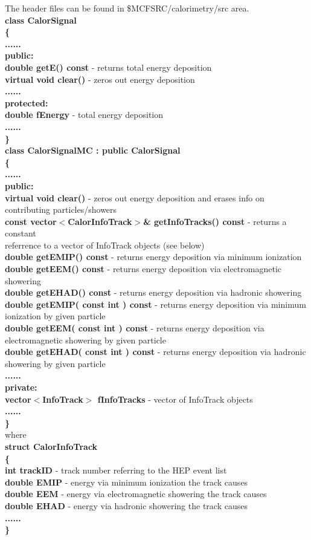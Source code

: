 The header files can be found in \$MCFSRC/calorimetry/src area. \\
{\bf class CalorSignal \\
\{ \\
...... \\
public: \\
double getE() const } - returns total energy deposition  \\
{\bf virtual void clear()} - zeros out energy deposition \\ 
{\bf ...... \\
protected: \\
double fEnergy } - total energy deposition \\
{\bf ...... \\
\} } \\
{\bf class CalorSignalMC : public CalorSignal \\
\{ \\
...... \\
public: \\
virtual void clear() } - zeros out energy deposition and erases info on contributing particles/showers \\
{\bf const vector$<$CalorInfoTrack$>$\& getInfoTracks() const} - returns a constant \\
referrence to a vector
of InfoTrack objects (see below) \\ 
{\bf double getEMIP() const} - returns energy deposition via minimum ionization \\
{\bf double getEEM()  const} - returns energy deposition via electromagnetic showering \\
{\bf double getEHAD() const} - returns energy deposition via hadronic showering \\
{\bf double getEMIP( const int ) const} - returns energy deposition via minimum ionization by given particle \\
{\bf double getEEM(  const int ) const} - returns energy deposition via electromagnetic showering by given particle \\ 
{\bf double getEHAD( const int ) const} - returns energy deposition via hadronic showering by given particle \\
{\bf ...... \\
private: \\
vector$<$InfoTrack$>$ fInfoTracks } - vector of InfoTrack objects \\
{\bf ...... \\
\} } \\
where \\
{\bf struct CalorInfoTrack \\
\{ \\
int trackID } - track number referring to the HEP event list \\
{\bf double EMIP } - energy via minimum ionization the track causes \\ 
{\bf double EEM } - energy via electromagnetic showering the track causes \\ 
{\bf double EHAD } - energy via hadronic showering the track causes \\ 
{\bf ...... \\
\} }      


